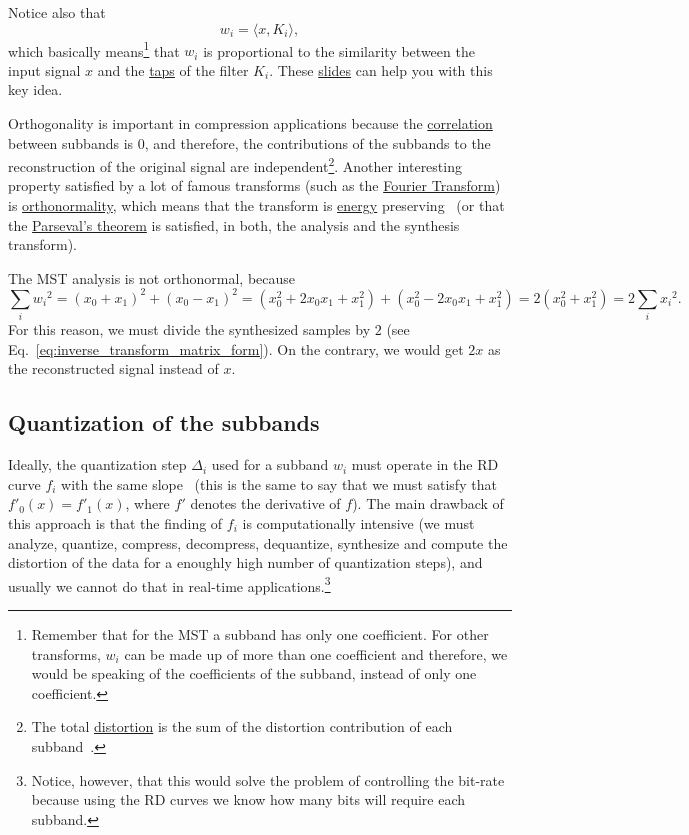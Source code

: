 Notice also that
\begin{equation}
  w_i = \langle x, K_i\rangle,
\end{equation}
which basically means\footnote{Remember that for the MST a subband has
  only one coefficient. For other transforms, $w_i$ can be made up of
  more than one coefficient and therefore, we would be speaking of the
  coefficients of the subband, instead of only one coefficient.} that
  $w_i$ is proportional to the similarity between the input signal $x$
  and
  the \href{https://en.wikipedia.org/wiki/Finite_impulse_response}{taps}
  of the filter $K_i$. These
\href{https://cseweb.ucsd.edu/classes/fa17/cse166-a/lec13.pdf}{slides}
can help you with this key idea.

Orthogonality is important in compression applications because the
\href{https://en.wikipedia.org/wiki/Correlation_and_dependence}{correlation}
between subbands is 0, and therefore, the contributions of the
subbands to the reconstruction of the original signal are
independent\footnote{The total
  \href{https://en.wikipedia.org/wiki/Distortion}{distortion} is the
  sum of the distortion contribution of each
  subband~\cite{sayood2017introduction}.}. Another interesting
property satisfied by a lot of famous transforms (such as the
\href{https://en.wikipedia.org/wiki/Fourier_transform}{Fourier
  Transform}) is
\href{https://en.wikipedia.org/wiki/Orthonormality}{orthonormality},
which means that the transform is
\href{https://en.wikipedia.org/wiki/Energy_(signal_processing)}{energy}
preserving~\cite{sayood2017introduction} (or that the
\href{https://en.wikipedia.org/wiki/Parseval%27s_theorem}{Parseval's theorem}
  is satisfied, in both, the analysis and the synthesis transform).

The MST analysis is not orthonormal, because
\begin{equation}
  \sum_i {w_i}^2 =
  (x_0+x_1)^2 + (x_0-x_1)^2 =
  (x_0^2+2x_0x_1+x_1^2) + (x_0^2-2x_0x_1+x_1^2) =
  2(x_0^2+x_1^2) =
  2\sum_i {x_i}^2.
  \label{eq:No_Parseval}
\end{equation}
For this reason, we must divide the synthesized samples by $2$ (see
Eq.~\ref{eq:inverse_transform_matrix_form}). On the contrary, we would
get $2x$ as the reconstructed signal instead of $x$.

\subsection{Quantization of the subbands}
Ideally, the quantization step $\Delta_i$ used for a subband $w_i$
must operate in the RD curve $f_i$ with the same
slope~\cite{vetterli2014foundations,sayood2017introduction} (this is
the same to say that we must satisfy that $f'_0(x)=f'_1(x)$, where
$f'$ denotes the derivative of $f$). The main drawback of this
approach is that the finding of $f_i$ is computationally intensive (we
must analyze, quantize, compress, decompress, dequantize, synthesize
and compute the distortion of the data for a enoughly high number of
quantization steps), and usually we cannot do that in real-time
applications.\footnote{Notice, however, that this would solve the
problem of controlling the bit-rate because using the RD curves we
know how many bits will require each subband.}

